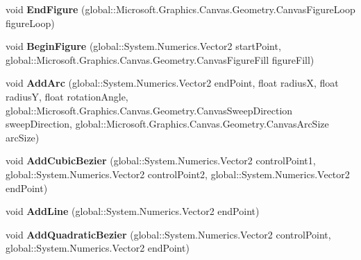 \begin{DoxyCompactItemize}
void {\bfseries End\+Figure} (global\+::\+Microsoft.\+Graphics.\+Canvas.\+Geometry.\+Canvas\+Figure\+Loop figure\+Loop)
\item 
\mbox{\label{interface_microsoft_1_1_graphics_1_1_canvas_1_1_geometry_1_1_i_canvas_path_receiver_aef7e5c282cbb5cd2800c4626abdf7981}} 
void {\bfseries Begin\+Figure} (global\+::\+System.\+Numerics.\+Vector2 start\+Point, global\+::\+Microsoft.\+Graphics.\+Canvas.\+Geometry.\+Canvas\+Figure\+Fill figure\+Fill)
\item 
\mbox{\label{interface_microsoft_1_1_graphics_1_1_canvas_1_1_geometry_1_1_i_canvas_path_receiver_a50a4758a3ed76ce6c8cd9868b31e29cf}} 
void {\bfseries Add\+Arc} (global\+::\+System.\+Numerics.\+Vector2 end\+Point, float radiusX, float radiusY, float rotation\+Angle, global\+::\+Microsoft.\+Graphics.\+Canvas.\+Geometry.\+Canvas\+Sweep\+Direction sweep\+Direction, global\+::\+Microsoft.\+Graphics.\+Canvas.\+Geometry.\+Canvas\+Arc\+Size arc\+Size)
\item 
\mbox{\label{interface_microsoft_1_1_graphics_1_1_canvas_1_1_geometry_1_1_i_canvas_path_receiver_ab770bd039e07f19239a6f9f563ccd042}} 
void {\bfseries Add\+Cubic\+Bezier} (global\+::\+System.\+Numerics.\+Vector2 control\+Point1, global\+::\+System.\+Numerics.\+Vector2 control\+Point2, global\+::\+System.\+Numerics.\+Vector2 end\+Point)
\item 
\mbox{\label{interface_microsoft_1_1_graphics_1_1_canvas_1_1_geometry_1_1_i_canvas_path_receiver_af4c3299bef8e5d0a0d801f7e730857f9}} 
void {\bfseries Add\+Line} (global\+::\+System.\+Numerics.\+Vector2 end\+Point)
\item 
\mbox{\label{interface_microsoft_1_1_graphics_1_1_canvas_1_1_geometry_1_1_i_canvas_path_receiver_a782bc874c27fca70636c3657fbd63fb8}} 
void {\bfseries Add\+Quadratic\+Bezier} (global\+::\+System.\+Numerics.\+Vector2 control\+Point, global\+::\+System.\+Numerics.\+Vector2 end\+Point)

\end{DoxyCompactItemize}
